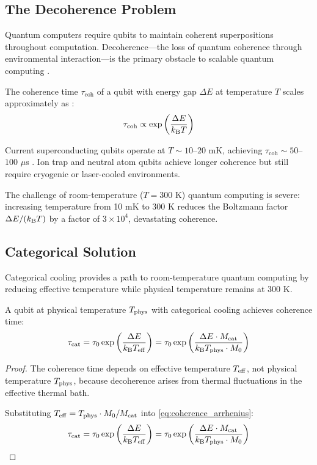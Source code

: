 \subsection{The Decoherence Problem}

Quantum computers require qubits to maintain coherent superpositions throughout computation. Decoherence---the loss of quantum coherence through environmental interaction---is the primary obstacle to scalable quantum computing \cite{zurek2003,schlosshauer2007}.

The coherence time $\tau_{\text{coh}}$ of a qubit with energy gap $\Delta E$ at temperature $T$ scales approximately as \cite{slichter1990}:
\begin{equation}
\tau_{\text{coh}} \propto \exp\left(\frac{\Delta E}{k_{\mathrm{B}} T}\right)
\label{eq:coherence_arrhenius}
\end{equation}

Current superconducting qubits operate at $T \sim 10$--$20$ mK, achieving $\tau_{\text{coh}} \sim 50$--$100$ $\mu$s \cite{kjaergaard2020,arute2019}. Ion trap and neutral atom qubits achieve longer coherence but still require cryogenic or laser-cooled environments.

The challenge of room-temperature ($T = 300$ K) quantum computing is severe: increasing temperature from 10 mK to 300 K reduces the Boltzmann factor $\Delta E/(k_{\mathrm{B}} T)$ by a factor of $3 \times 10^4$, devastating coherence.

\subsection{Categorical Solution}

Categorical cooling provides a path to room-temperature quantum computing by reducing effective temperature while physical temperature remains at 300 K.

\begin{theorem}
\label{thm:coherence_enhancement}
A qubit at physical temperature $T_{\mathrm{phys}}$ with categorical cooling achieves coherence time:
\begin{equation}
\tau_{\text{cat}} = \tau_0 \exp\left(\frac{\Delta E}{k_{\mathrm{B}} T_{\mathrm{eff}}}\right) = \tau_0 \exp\left(\frac{\Delta E \cdot M_{\mathrm{cat}}}{k_{\mathrm{B}} T_{\mathrm{phys}} \cdot M_0}\right)
\label{eq:categorical_coherence}
\end{equation}
\end{theorem}

\begin{proof}
The coherence time depends on effective temperature $T_{\mathrm{eff}}$, not physical temperature $T_{\mathrm{phys}}$, because decoherence arises from thermal fluctuations in the effective thermal bath.

Substituting $T_{\mathrm{eff}} = T_{\mathrm{phys}} \cdot M_0/M_{\mathrm{cat}}$ into \eqref{eq:coherence_arrhenius}:
\begin{equation}
\tau_{\text{cat}} = \tau_0 \exp\left(\frac{\Delta E}{k_{\mathrm{B}} T_{\mathrm{eff}}}\right) = \tau_0 \exp\left(\frac{\Delta E \cdot M_{\mathrm{cat}}}{k_{\mathrm{B}} T_{\mathrm{phys}} \cdot M_0}\right)
\end{equation}
\end{proof}

